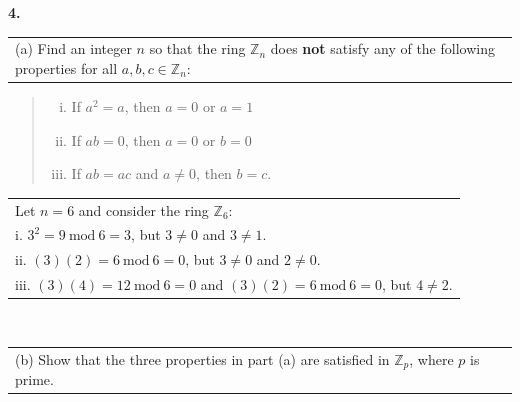 \documentclass[12pt, letterpaper]{article}
\begin{document}
\bigskip

\textbf{4.} \begin{tabular}[t]{@{}p{}@{}}
    (a) Find an integer $n$ so that the ring $\mathbb{Z}_n$ does \textbf{not} satisfy any of the following properties for all $a, b, c \in \mathbb{Z}_n$:
\end{tabular}

\begin{quote}
    \begin{enumerate}[i.]
        \item If $a^2 = a$, then $a = 0$ or $a = 1$ 
        \item If $ab = 0$, then $a = 0$ or $b = 0$
        \item If $ab = ac$ and $a \neq 0$, then $b = c$.
    \end{enumerate}
\end{quote} 

\indent \indent \begin{tabular}[t]{l} 
    Let $n = 6$ and consider the ring $\mathbb{Z}_6$:  \\
    \indent i. $3^{2} = 9 \ \text{mod} \ 6 = 3$, but $3 \neq 0$ and $3 \neq 1$. \\
    \indent ii. $(3)(2) = 6 \ \text{mod} \ 6 = 0$, but $3 \neq 0$ and $2 \neq 0$. \\
    \indent iii. $(3)(4) = 12 \ \text{mod} \ 6 = 0$ and $(3)(2) = 6 \ \text{mod} \ 6 = 0$, but $4 \neq 2$. \\
    \end{tabular} \\
\begin{tabular}[t]{@{}p{}@{}}
    \phantom{\textbf{4.} }(b) Show that the three properties in part (a) are satisfied in $\mathbb{Z}_p$, where $p$ is prime.
\end{tabular} \\
\end{document}
